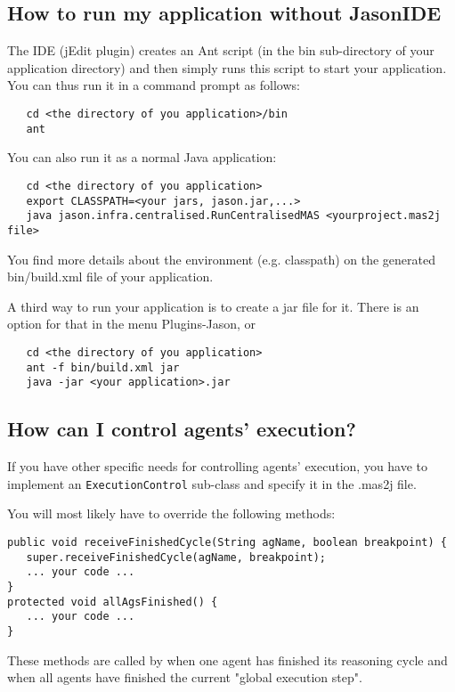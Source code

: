 \documentclass{article}
\newcommand{\jason}[0]{\htlink{\textit{Jason}}{http://jason.sf.net}\xspace}
\newcommand{\code}[1]{\texttt{#1}}
\begin{document}
\subsection{How to run my application without JasonIDE}

The \Jason IDE (jEdit plugin) creates an Ant script (in the bin sub-directory
of your application directory) and then simply runs this script to start your
\Jason application. You can thus run it in a command prompt as follows:
\begin{verbatim}
   cd <the directory of you application>/bin
   ant
\end{verbatim}

You can also run it as a normal Java application:
\begin{verbatim}
   cd <the directory of you application>
   export CLASSPATH=<your jars, jason.jar,...>
   java jason.infra.centralised.RunCentralisedMAS <yourproject.mas2j file>
\end{verbatim}
You find more details about the environment (e.g. classpath) on the generated
bin/build.xml file of your application.

A third way to run your application is to create a jar file for it. There is
an option for that in the menu Plugins-Jason, or
\begin{verbatim}
   cd <the directory of you application>
   ant -f bin/build.xml jar
   java -jar <your application>.jar
\end{verbatim}


\subsection{How can I control agents' execution?}\label{sec:controlclass}

If you have other specific needs for controlling agents' execution, you have
to implement an \code{ExecutionControl} sub-class and specify it in the .mas2j
file.

You will most likely have to override the following methods:

\begin{verbatim}
public void receiveFinishedCycle(String agName, boolean breakpoint) {
   super.receiveFinishedCycle(agName, breakpoint);
   ... your code ...
}
protected void allAgsFinished() {
   ... your code ...
}
\end{verbatim}

These methods are called by \jason when one agent has finished its reasoning
cycle and when all agents have finished the current "global execution step".
\end{document}

